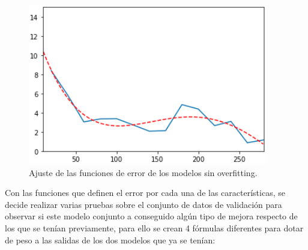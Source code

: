 \begin{figure}[H]
\begin{minipage}{0.32\textwidth}
		\includegraphics[width=1\linewidth]{Book/figures/6_approx_distancia/ensemble_not_overfitting_2.png}
	\end{minipage}
	\caption{Ajuste de las funciones de error de los modelos sin overfitting.}
	\label{fig:Ajuste de las funciones de error de los modelos sin overfitting.}
\end{figure}

Con las funciones que definen el error por cada una de las características, se decide realizar varias pruebas sobre el conjunto de datos de validación para observar si este modelo conjunto a conseguido algún tipo de mejora respecto de los que se tenían previamente, para ello se crean 4 fórmulas diferentes para dotar de peso a las salidas de los dos modelos que ya se tenían:


